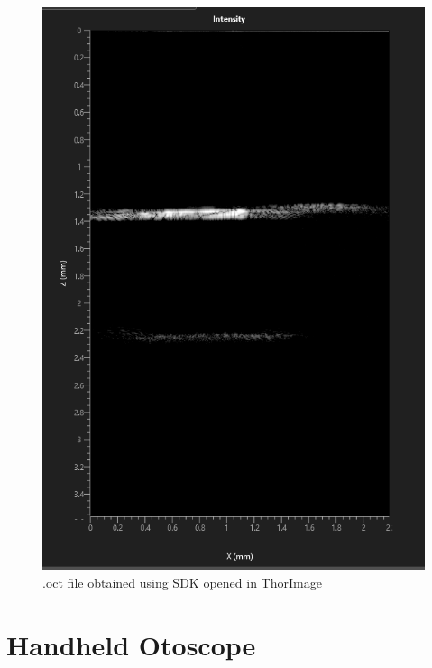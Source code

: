 \begin{figure}[H]\label{fig4.9}
\centering \includegraphics[scale=0.35]{Images/OCT_image_from_SDK.PNG}
\caption{.oct file obtained using SDK opened in ThorImage}
\end{figure}

\section{Handheld Otoscope}
